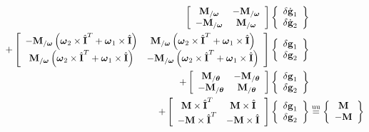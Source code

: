 \documentclass[10pt,dvips,fleqn,subeqn]{report}
\newcommand{\T}[1]{\bm{\mathbf{#1}}}
\newcommand{\equu}{\overset{\text{uu}}{=}}
\begin{document}
\begin{align}
	\sqbr{\matr{cc}{
		\T{M}_{/\T{\omega}} & - \T{M}_{/\T{\omega}} \\
		- \T{M}_{/\T{\omega}} & \T{M}_{/\T{\omega}}
	}} \cubr{\cvvect{
		\delta\dot{\T{g}}_1 \\
		\delta\dot{\T{g}}_2
	}} & \nonumber \\
	+ \sqbr{\matr{cc}{
		- \T{M}_{/\T{\omega}} \plbr{\T{\omega}_2 \times \hat{\T{I}}^T + \T{\omega}_1\times \hat{\T{I}}}
			& \T{M}_{/\T{\omega}} \plbr{\T{\omega}_2 \times \hat{\T{I}}^T + \T{\omega}_1\times \hat{\T{I}}} \\
		\T{M}_{/\T{\omega}} \plbr{\T{\omega}_2\times \hat{\T{I}}^T + \T{\omega}_1\times \hat{\T{I}}}
			& - \T{M}_{/\T{\omega}} \plbr{\T{\omega}_2 \times \hat{\T{I}}^T + \T{\omega}_1\times \hat{\T{I}}}
	}} \cubr{\cvvect{
		\delta\T{g}_1 \\
		\delta\T{g}_2
	}} & \nonumber \\
	+ \sqbr{\matr{cc}{
		\T{M}_{/\T{\theta}} & - \T{M}_{/\T{\theta}} \\
		- \T{M}_{/\T{\theta}} & \T{M}_{/\T{\theta}}
	}} \cubr{\cvvect{
		\delta\T{g}_1 \\
		\delta\T{g}_2
	}} & \nonumber \\
	+ \sqbr{\matr{cc}{
		\T{M} \times \hat{\T{I}}^T & \T{M} \times \hat{\T{I}} \\
		- \T{M} \times \hat{\T{I}}^T & - \T{M} \times \hat{\T{I}}
	}} \cubr{\cvvect{
		\delta\T{g}_1 \\
		\delta\T{g}_2
	}} &\equu \cubr{\cvvect{
		\T{M} \\
		- \T{M}
	}}
\end{align}
\end{document}
